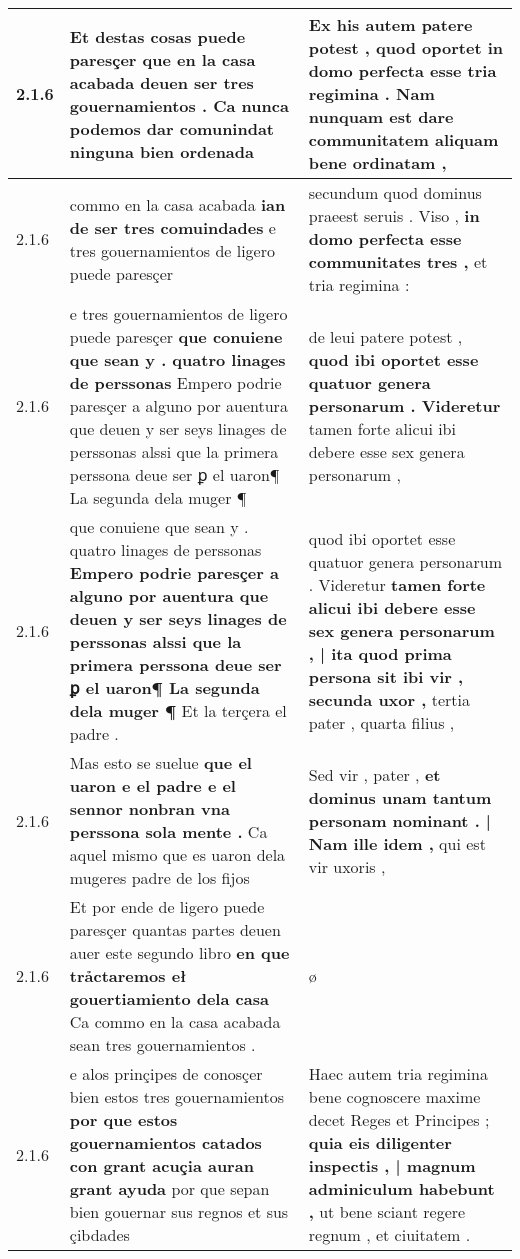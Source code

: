 \begin{tabular}{|p{1cm}|p{6.5cm}|p{6.5cm}|}
2.1.6 & Et destas cosas puede paresçer \textbf{ que en la casa acabada deuen ser tres gouernamientos . } Ca nunca podemos dar comunindat ninguna bien ordenada & Ex his autem patere potest , \textbf{ quod oportet in domo perfecta esse tria regimina . } Nam nunquam est dare communitatem aliquam bene ordinatam , \\\hline
2.1.6 & commo en la casa acabada \textbf{ ian de ser tres comuindades } e tres gouernamientos de ligero puede paresçer & secundum quod dominus praeest seruis . Viso , \textbf{ in domo perfecta esse communitates tres , } et tria regimina : \\\hline
2.1.6 & e tres gouernamientos de ligero puede paresçer \textbf{ que conuiene que sean y . quatro linages de perssonas } Empero podrie paresçer a alguno por auentura que deuen y ser seys linages de perssonas alssi que la primera perssona deue ser ꝑ el uaron¶ La segunda dela muger ¶ & de leui patere potest , \textbf{ quod ibi oportet esse quatuor genera personarum . Videretur } tamen forte alicui ibi debere esse sex genera personarum , \\\hline
2.1.6 & que conuiene que sean y . quatro linages de perssonas \textbf{ Empero podrie paresçer a alguno por auentura que deuen y ser seys linages de perssonas alssi que la primera perssona deue ser ꝑ el uaron¶ La segunda dela muger ¶ } Et la terçera el padre . & quod ibi oportet esse quatuor genera personarum . Videretur \textbf{ tamen forte alicui ibi debere esse sex genera personarum , | ita quod prima persona sit ibi vir , secunda uxor , } tertia pater , quarta filius , \\\hline
2.1.6 & Mas esto se suelue \textbf{ que el uaron e el padre e el sennor nonbran vna perssona sola mente . } Ca aquel mismo que es uaron dela mugeres padre de los fijos & Sed vir , pater , \textbf{ et dominus unam tantum personam nominant . | Nam ille idem , } qui est vir uxoris , \\\hline
2.1.6 & Et por ende de ligero puede paresçer quantas partes deuen auer este segundo libro \textbf{ en que trảctaremos eł gouertiamiento dela casa } Ca commo en la casa acabada sean tres gouernamientos . & ø \\\hline
2.1.6 & e alos prinçipes de conosçer bien estos tres gouernamientos \textbf{ por que estos gouernamientos catados con grant acuçia auran grant ayuda } por que sepan bien gouernar sus regnos et sus çibdades & Haec autem tria regimina bene cognoscere maxime decet Reges et Principes ; \textbf{ quia eis diligenter inspectis , | magnum adminiculum habebunt , } ut bene sciant regere regnum , et ciuitatem . \\\hline

\end{tabular}
